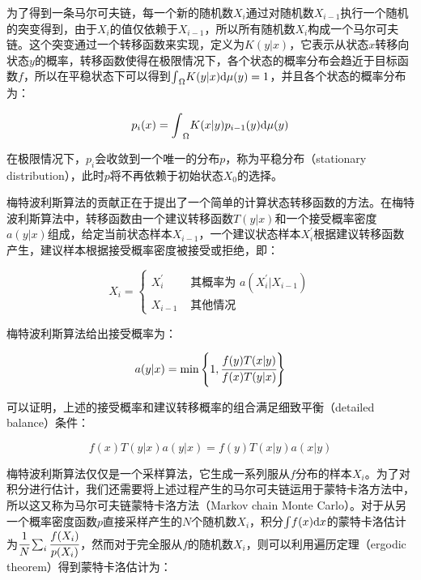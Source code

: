 为了得到一条马尔可夫链，每一个新的随机数${X}_i$通过对随机数${X}_{i-1}$执行一个随机的突变得到，由于${X}_i$的值仅依赖于${X}_{i-1}$，所以所有随机数${X}_i$构成一个马尔可夫链。这个突变通过一个转移函数来实现，定义为$K({y}|{x})$，它表示从状态${x}$转移向状态${y}$的概率，转移函数使得在极限情况下，各个状态的概率分布会趋近于目标函数$f$，所以在平稳状态下可以得到${\rm \int}_{\Omega}K({y}|{x}){\rm d}\mu ({y})=1$，并且各个状态的概率分布为：

\begin{equation}
	p_i({x})={\rm \int}_{\Omega}K({x}|{y})p_{i-1}({y}){\rm d}\mu({y})
\end{equation}

\noindent 在极限情况下，$p_i$会收敛到一个唯一的分布$p$，称为平稳分布（stationary distribution），此时$p$将不再依赖于初始状态${X}_0$的选择。

梅特波利斯算法的贡献正在于提出了一个简单的计算状态转移函数的方法。在梅特波利斯算法中，转移函数由一个建议转移函数$T({y}|{x})$和一个接受概率密度$a({y}|{x})$组成，给定当前状态样本${X}_{i-1}$，一个建议状态样本${X}^{'}_i$根据建议转移函数产生，建议样本根据接受概率密度被接受或拒绝，即：

\begin{equation}
	{X}_i=\begin{cases}
		{X}^{'}_i & \text{ 其概率为 }a({X}^{'}_i|{X}_{i-1})\\
		{X}_{i-1} & \text{ 其他情况 }
	\end{cases}
\end{equation}

\noindent 梅特波利斯算法给出接受概率为：

\begin{equation}\label{e:mlt-acceptance}
	a({y}|{x})=\min \Bigg\{1, \cfrac{f({y})T({x}|{y})}{f({x})T({y}|{x})}\Bigg\}
\end{equation}

\noindent 可以证明，上述的接受概率和建议转移概率的组合满足细致平衡（detailed balance）条件：

\begin{equation}
	f({x})T({y}|{x})a({y}|{x})=f({y})T({x}|{y})a({x}|{y})
\end{equation}

梅特波利斯算法仅仅是一个采样算法，它生成一系列服从$f$分布的样本${X}_i$。为了对积分进行估计，我们还需要将上述过程产生的马尔可夫链运用于蒙特卡洛方法中，所以这又称为马尔可夫链蒙特卡洛方法（Markov chain Monte Carlo）。对于从另一个概率密度函数$p$直接采样产生的$N$个随机数$X_i$，积分${\rm \int} f(x){\rm d}x$的蒙特卡洛估计为$ \cfrac{1}{N}\sum_i \cfrac{f(X_i)}{p(X_i)}$，然而对于完全服从$f$的随机数${X}_i$，则可以利用遍历定理（ergodic theorem）得到蒙特卡洛估计为：

